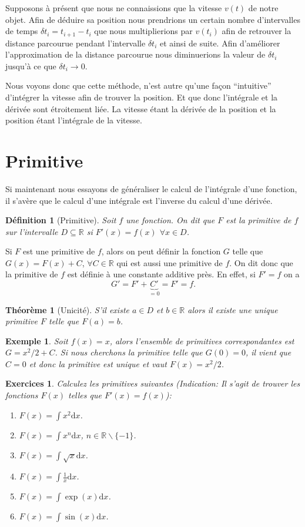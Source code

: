 \documentclass[a4paper,12pt]{book}
\newcommand{\real}{\mathbb{R}}
\newcommand{\dd}{\mathrm{d}}
\newtheorem{definition}{Définition}
\newtheorem*{exemple}{Exemple}
\newtheorem*{exercices}{Exercices}
\newtheorem{theoreme}{Théorème}
\begin{document}
Supposons à présent que nous ne connaissions que la vitesse $v(t)$ de notre objet. Afin de déduire sa position
nous prendrions un certain nombre d'intervalles de temps $\delta t_i=t_{i+1}-t_i$ que nous multiplierions
par $v(t_i)$ afin de retrouver la distance parcourue pendant l'intervalle $\delta t_i$
et ainsi de suite. Afin d'améliorer l'approximation de la distance parcourue 
nous diminuerions la valeur de $\delta t_i$ jusqu'à ce que $\delta t_i\rightarrow 0$.

Nous voyons donc que cette méthode, n'est autre qu'une façon ``intuitive'' d'intégrer la vitesse afin de trouver la position.
Et que donc l'intégrale et la dérivée sont étroitement liée. La vitesse étant la dérivée de la position et la position étant l'intégrale de la vitesse.


\section{Primitive}
Si maintenant nous essayons de généraliser le calcul de l'intégrale d'une fonction,
il s'avère que le calcul d'une intégrale est l'inverse du calcul d'une dérivée.

\begin{definition}[Primitive]
Soit $f$ une fonction. On dit que $F$ est la primitive de $f$ sur l'intervalle $D\subseteq\real$ si $F'(x)=f(x)$  $\forall x\in D$.
\end{definition}

Si $F$ est une primitive de $f$, alors on peut définir la fonction $G$ telle que $G(x)=F(x)+C$, $\forall C\in\real$ 
qui est aussi une primitive de $f$. On dit donc que la primitive de $f$ est définie à une constante additive près. En effet,
si $F'=f$ on a
\begin{equation}
 G'=F'+\underbrace{C'}_{=0}=F'=f.
\end{equation}
\begin{theoreme}[Unicité]
S'il existe $a\in D$ et $b\in\real$ alors il existe une unique primitive
$F$ telle que $F(a)=b$.
\end{theoreme}
\begin{exemple}
 Soit $f(x)=x$, alors l'ensemble de primitives correspondantes est $G=x^2/2+C$. Si nous cherchons la 
 primitive telle que $G(0)=0$, il vient que $C=0$ et donc la primitive est unique et vaut
 $F(x)=x^2/2$.
\end{exemple}
\begin{exercices}
Calculez les primitives suivantes (\textit{Indication: Il s'agit de trouver les fonctions $F(x)$ telles que $F'(x)=f(x)$}):
 \begin{enumerate}
  \item $F(x)=\int x^2\dd x$.
  \item $F(x)=\int x^n\dd x$, $n\in \real\backslash\{-1\}$.
  \item $F(x)=\int \sqrt{x}\dd x$.
  \item $F(x)=\int \frac{1}{x}\dd x$.
  \item $F(x)=\int \exp(x)\dd x$.
  \item $F(x)=\int \sin(x)\dd x$.
 \end{enumerate}
\end{exercices}
\end{document}
